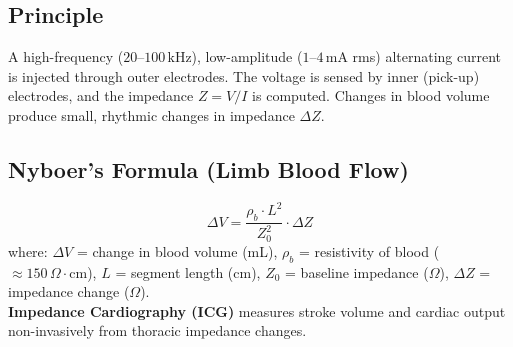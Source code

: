 \documentclass[12pt,a4paper]{article}
\begin{document}
\subsection{Principle}

A high-frequency ($20$--$100\,\text{kHz}$), low-amplitude ($1$--$4\,\text{mA}$ rms) alternating current is injected through outer electrodes. The voltage is sensed by inner (pick-up) electrodes, and the impedance $Z = V/I$ is computed. Changes in blood volume produce small, rhythmic changes in impedance $\Delta Z$.

\subsection{Nyboer's Formula (Limb Blood Flow)}

\begin{tcolorbox}[formulabox, title={\textbf{Impedance Plethysmography Formulas}}]
\[
\Delta V = \frac{\rho_b \cdot L^2}{Z_0^2} \cdot \Delta Z
\]
where: $\Delta V$ = change in blood volume (mL), $\rho_b$ = resistivity of blood ($\approx 150\,\Omega\cdot\text{cm}$), $L$ = segment length (cm), $Z_0$ = baseline impedance ($\Omega$), $\Delta Z$ = impedance change ($\Omega$). \\[6pt]
\textbf{Impedance Cardiography (ICG)} measures stroke volume and cardiac output non-invasively from thoracic impedance changes.
\end{tcolorbox}
\end{document}
